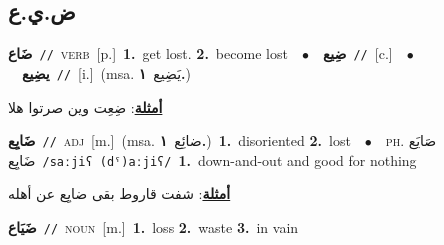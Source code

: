 \documentclass[10pt,a4paper,twoside]{article} %
\begin{document}
\begin{multicols}{2}
\vspace{-3mm}
\subsection*{\color{blue}\foreignlanguage{arabic}{ض.ي.ع}\color{blue}{}} 

{\setlength\topsep{0pt}\textbf{\foreignlanguage{arabic}{ضَاع}}\ {\color{gray}\texttt{//}\color{black}}\ \textsc{verb}\ [p.]\ \textbf{1.}~get lost.  \textbf{2.}~become lost\ \ $\bullet$\ \ \setlength\topsep{0pt}\textbf{\foreignlanguage{arabic}{ضِيع}}\ {\color{gray}\texttt{//}\color{black}}\ [c.]\ \ $\bullet$\ \ \setlength\topsep{0pt}\textbf{\foreignlanguage{arabic}{يضِيع}}\ {\color{gray}\texttt{//}\color{black}}\ [i.]\ \color{gray}(msa. \foreignlanguage{arabic}{يَضِيع}~\foreignlanguage{arabic}{\textbf{١.}})\color{black}\  \begin{flushright}\color{gray}\foreignlanguage{arabic}{\textbf{\underline{\foreignlanguage{arabic}{أمثلة}}}: ضِعِت وين صرتوا هلا}\end{flushright}\color{black}} \vspace{2mm}

{\setlength\topsep{0pt}\textbf{\foreignlanguage{arabic}{ضَايِع}}\ {\color{gray}\texttt{//}\color{black}}\ \textsc{adj}\ [m.]\ \color{gray}(msa. \foreignlanguage{arabic}{ضائِع}~\foreignlanguage{arabic}{\textbf{١.}})\color{black}\ \textbf{1.}~disoriented  \textbf{2.}~lost\ \ $\bullet$\ \ \textsc{ph.} \color{gray} \foreignlanguage{arabic}{صَايَع ضَايِع}\color{black}\ {\color{gray}\texttt{/{\sffamily saːjiʕ (dˤ)aːjiʕ}/}\color{black}}\ \textbf{1.}~down-and-out and good for nothing\  \begin{flushright}\color{gray}\foreignlanguage{arabic}{\textbf{\underline{\foreignlanguage{arabic}{أمثلة}}}: شفت قاروط بقى ضايِع عن أهله}\end{flushright}\color{black}} \vspace{2mm}

{\setlength\topsep{0pt}\textbf{\foreignlanguage{arabic}{ضَيَاع}}\ {\color{gray}\texttt{//}\color{black}}\ \textsc{noun}\ [m.]\ \textbf{1.}~loss  \textbf{2.}~waste  \textbf{3.}~in vain\ } \vspace{2mm}


\end{multicols}
\end{document}
